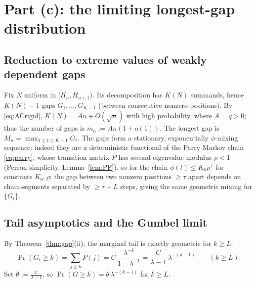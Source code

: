 \documentclass[12pt]{article}
\theoremstyle{definition}
\begin{document}
\section{Part (c): the limiting longest-gap distribution}

\subsection{Reduction to extreme values of weakly dependent gaps}
Fix $N$ uniform in $[H_n,H_{n+1})$. Its decomposition has $K(N)$ summands, hence
$K(N)-1$ gaps $G_1,\dots,G_{K-1}$ (between consecutive nonzero positions). By
\eqref{eq:ACrigid}, $K(N)=An+O(\sqrt n)$ with high probability, where $A=q>0$;
thus the number of gaps is $m_n:=An(1+o(1))$. The longest gap is
$M_n=\max_{1\le t\le K-1}G_t$. The gaps form a stationary, exponentially
$\phi$-mixing sequence: indeed they are a deterministic functional of the Parry
Markov chain \eqref{eq:parry}, whose transition matrix $P$ has second eigenvalue
modulus $\rho<1$ (Perron simplicity, Lemma~\ref{lem:PF}), so for the chain
$\phi(t)\le K_0\rho^{\,t}$ for constants $K_0,\rho$; the gap between two nonzero
positions $\ge \tau$ apart depends on chain-segments separated by $\ge\tau-L$
steps, giving the same geometric mixing for $\{G_t\}$.

\subsection{Tail asymptotics and the Gumbel limit}
By Theorem~\ref{thm:gap}(ii), the marginal tail is exactly geometric for
$k\ge L$:
\begin{equation}\label{eq:tailprob}
\Pr(G_t\ge k)=\sum_{j\ge k}P(j)=C\,\frac{\lambda^{-k}}{1-\lambda^{-1}}
=\frac{C}{\lambda-1}\,\lambda^{-(k-1)}\qquad(k\ge L).
\end{equation}
Set $\theta:=\frac{C}{\lambda-1}$, so $\Pr(G\ge k)=\theta\,\lambda^{-(k-1)}$ for
$k\ge L$.
\end{document}
